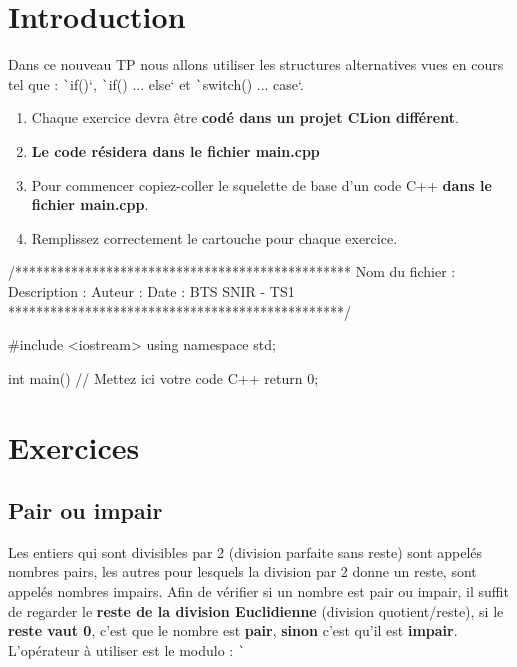 \documentclass[10pt]{article}
\begin{document}
\cartouche
\thispagestyle{firstpage}

\section*{Introduction}
Dans ce nouveau TP nous allons utiliser les structures alternatives vues en cours tel que : \texttt`if()`,
\texttt`if() ... else` et \texttt`switch() ... case`.

\begin{enumerate}
    \item Chaque exercice devra être \textbf{codé dans un projet CLion différent}.
    \item \textbf{Le code résidera dans le fichier main.cpp}
    \item Pour commencer copiez-coller le squelette de base d'un code C++ \textbf{dans le fichier main.cpp}.
    \item Remplissez correctement le cartouche pour chaque exercice.
\end{enumerate}

\begin{cppcode}
    /************************************************
    Nom du fichier : 
    Description : 
    Auteur :
    Date :
    BTS SNIR - TS1
    ************************************************/

    #include <iostream>
    using namespace std;

    int main() {
        // Mettez ici votre code C++
        return 0;
    }
\end{cppcode}


\section{Exercices}

\subsection{Pair ou impair}
Les entiers qui sont divisibles par 2 (division parfaite sans reste) sont appelés nombres pairs, les autres pour lesquels
la division par 2 donne un reste, sont appelés nombres impairs.
\smallskip
Afin de vérifier si un nombre est pair ou impair, il suffit de regarder le \textbf{reste de la division Euclidienne} (division quotient/reste), si le \textbf{reste vaut 0}, c'est que le nombre est \textbf{pair}, \textbf{sinon} c'est qu'il est \textbf{impair}. L'opérateur à utiliser est le modulo : \texttt`%
\end{document}
